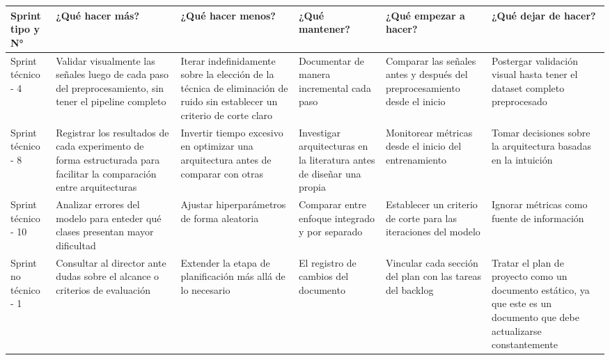 \documentclass[
11pt, %
]{charter}
\begin{document}
\begin{table}[H]
\renewcommand{\arraystretch}{1.4}
\begin{tabular}{|>{\raggedright\arraybackslash}p{1.8cm}|
                >{\raggedright\arraybackslash}p{2.3cm}|
                >{\raggedright\arraybackslash}p{2.3cm}|
                >{\raggedright\arraybackslash}p{2.3cm}|
                >{\raggedright\arraybackslash}p{2.3cm}|
                >{\raggedright\arraybackslash}p{2.3cm}|}
\hline
\rowcolor[HTML]{CCCCCC} 
\textbf{Sprint tipo y N°} & \textbf{¿Qué hacer más?} & \textbf{¿Qué hacer menos?} & \textbf{¿Qué mantener?} & \textbf{¿Qué empezar a hacer?} & \textbf{¿Qué dejar de hacer?} \\
\hline
Sprint técnico - 4 & Validar visualmente las señales luego de cada paso del preprocesamiento, sin tener el pipeline completo & Iterar indefinidamente sobre la elección de la técnica de eliminación de ruido sin establecer un criterio de corte claro & Documentar de manera incremental cada paso & Comparar las señales antes y después del preprocesamiento desde el inicio  & Postergar validación visual hasta tener el dataset completo preprocesado \\
\hline
Sprint técnico - 8 & Registrar los resultados de cada experimento de forma estructurada para facilitar la comparación entre arquitecturas & Invertir tiempo excesivo en optimizar una arquitectura antes de comparar con otras & Investigar arquitecturas en la literatura antes de diseñar una propia & Monitorear métricas desde el inicio del entrenamiento & Tomar decisiones sobre la arquitectura basadas en la intuición \\
\hline
Sprint técnico - 10 & Analizar errores del modelo para enteder qué clases presentan mayor dificultad & Ajustar hiperparámetros de forma aleatoria & Comparar entre enfoque integrado y por separado & Establecer un criterio de corte para las iteraciones del modelo & Ignorar métricas como fuente de información \\
\hline
Sprint no técnico - 1 & Consultar al director ante dudas sobre el alcance o criterios de evaluación & Extender la etapa de planificación más allá de lo necesario & El registro de cambios del documento & Vincular cada sección del plan con las tareas del backlog & Tratar el plan de proyecto como un documento estático, ya que este es un documento que debe actualizarse constantemente \\
\hline
\end{tabular}
\end{table}
\end{document}
